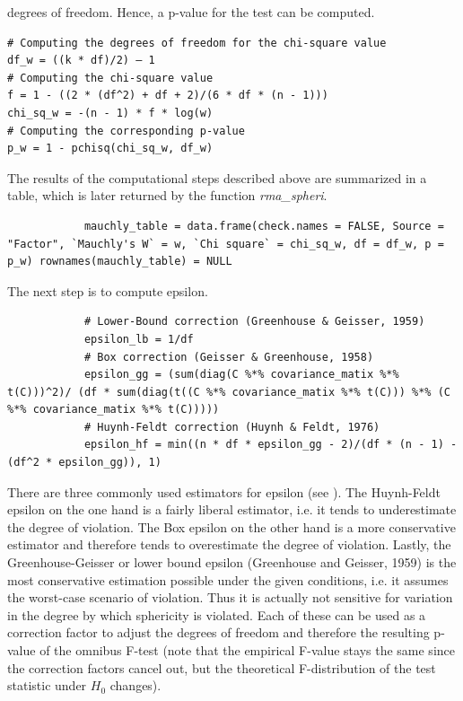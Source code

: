 \documentclass[11pt]{article}
\begin{document}
		
		degrees of freedom. Hence, a p-value for the test can be computed.\\
		
		\begin{lstlisting}
# Computing the degrees of freedom for the chi-square value 
df_w = ((k * df)/2) – 1
# Computing the chi-square value 
f = 1 - ((2 * (df^2) + df + 2)/(6 * df * (n - 1))) 
chi_sq_w = -(n - 1) * f * log(w)
# Computing the corresponding p-value
p_w = 1 - pchisq(chi_sq_w, df_w)
		\end{lstlisting} 
		
		The results of the computational steps described above are summarized in a table, which is later returned by the function \textit{rma_spheri}.
		
		\begin{lstlisting}
			mauchly_table = data.frame(check.names = FALSE, Source = "Factor", `Mauchly's W` = w, `Chi square` = chi_sq_w, df = df_w, p = p_w) rownames(mauchly_table) = NULL
		\end{lstlisting}
		
		The next step is to compute epsilon.
		
		\begin{lstlisting}
			# Lower-Bound correction (Greenhouse & Geisser, 1959) 
			epsilon_lb = 1/df
			# Box correction (Geisser & Greenhouse, 1958) 
			epsilon_gg = (sum(diag(C %*% covariance_matix %*% t(C)))^2)/ (df * sum(diag(t((C %*% covariance_matix %*% t(C))) %*% (C %*% covariance_matix %*% t(C)))))
			# Huynh-Feldt correction (Huynh & Feldt, 1976) 
			epsilon_hf = min((n * df * epsilon_gg - 2)/(df * (n - 1) - (df^2 * epsilon_gg)), 1)
		\end{lstlisting}
		
		There are three commonly used estimators for epsilon (see \cite{rutherford2001introducing}). The Huynh-Feldt epsilon \citep{huynh1976estimation} on the one hand is a fairly liberal estimator, i.e. it tends to underestimate the degree of violation. The Box epsilon \citep{box1954some, geisser1958extension} on the other hand is a more conservative estimator and therefore tends to overestimate the degree of violation. Lastly, the Greenhouse-Geisser or lower bound epsilon (Greenhouse and Geisser, 1959) is the most conservative estimation possible under the given conditions, i.e. it assumes the worst-case scenario of violation. Thus it is actually not sensitive for variation in the degree by which sphericity is violated. Each of these can be used as a correction factor to adjust the degrees of freedom and therefore the resulting p-value of the omnibus F-test (note that the empirical F-value stays the same since the correction factors cancel out, but the theoretical F-distribution of the test statistic under $H_0$ changes).
		
\end{document}
